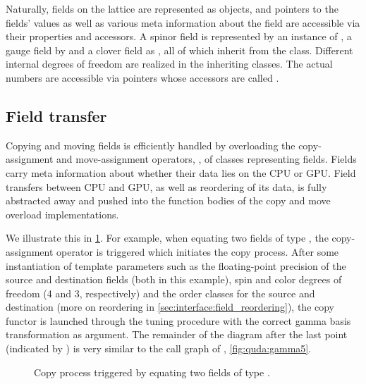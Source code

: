 Naturally, fields on the lattice are represented as objects, and pointers to the fields' values as well as various meta information about the field are accessible via their properties and accessors.
A spinor field is represented by an instance of , a gauge field by  and a clover field as , all of which inherit from the  class. Different internal degrees of freedom are realized in the inheriting classes. The actual numbers are accessible via pointers whose accessors are called .

\subsection{Field transfer}

Copying and moving fields is efficiently handled by overloading the copy-assignment and move-assignment operators, , of classes representing fields.
Fields carry meta information about whether their data lies on the CPU or GPU.
Field transfers between CPU and GPU, as well as reordering of its data, is fully abstracted away and pushed into the function bodies of the copy and move overload implementations.


We illustrate this in \cref{fig:quda:copy}.
For example, when equating two fields of type , the copy-assignment operator is triggered which initiates the copy process.
After some instantiation of template parameters such as the floating-point precision of the source  and destination  fields (both  in this example), spin and color degrees of freedom (\num{4} and \num{3}, respectively) and the order classes for the source and destination (more on reordering in \cref{sec:interface:field_reordering}), the copy functor  is launched through the tuning procedure with the correct gamma basis transformation as argument.
The remainder of the diagram after the last point (indicated by ) is very similar to the call graph of , \cref{fig:quda:gamma5}.
\begin{figure}
  
  \caption{Copy process triggered by equating two fields of type .}
  \label{fig:quda:copy}
\end{figure}

